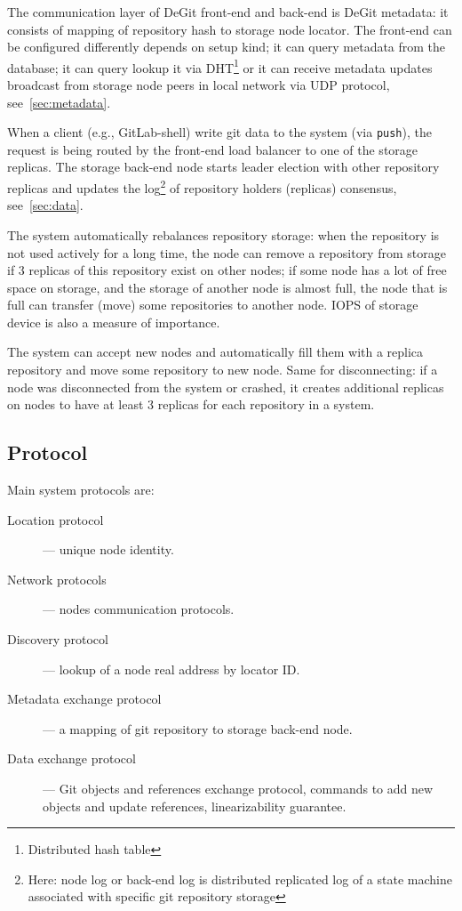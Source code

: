 \documentclass[acmlarge, screen, nonacm, 11pt]{acmart}
\newcommand{\code}[1]{\texttt{#1}}
\begin{document}
The communication layer of DeGit front-end and back-end is DeGit metadata: it consists of mapping
of repository hash to storage node locator. The front-end can be configured differently depends on
setup kind; it can query metadata from the database; it can query lookup it via DHT\footnote{Distributed hash table}
or it can receive metadata updates broadcast from storage node peers in local network via UDP protocol,
see~\ref{sec:metadata}.

When a client (e.g., GitLab-shell) write git data to the system (via \code{push}), the request is being routed
by the front-end load balancer to one of the storage replicas.
The storage back-end node starts leader election with other repository replicas and updates the log\footnote{Here: node log
or back-end log is distributed replicated log of a state machine associated with specific git repository storage}
of repository holders (replicas) consensus, see~\ref{sec:data}.

The system automatically rebalances repository storage: when the repository is not used actively for a
long time, the node can remove a repository from storage if 3 replicas of this repository exist on other nodes;
if some node has a lot of free space on storage, and the storage of another node is almost full,
the node that is full can transfer (move) some repositories to another node. IOPS of storage device is also
a measure of importance.

The system can accept new nodes and automatically fill them with a replica repository and
move some repository to new node. Same for disconnecting: if a node was disconnected from the system or crashed,
it creates additional replicas on nodes to have at least 3 replicas for each repository in a system.

\subsection{Protocol}
Main system protocols are:
\begin{description}
  \item[Location protocol] --- unique node identity.
  \item[Network protocols] --- nodes communication protocols.
  \item[Discovery protocol] --- lookup of a node real address by locator ID.
  \item[Metadata exchange protocol] --- a mapping of git repository to storage back-end node.
  \item[Data exchange protocol] --- Git objects and references exchange protocol,
    commands to add new objects and update references, linearizability guarantee.
\end{description}
\end{document}
